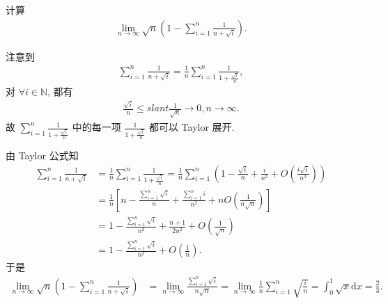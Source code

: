 \documentclass[../../main.tex]{subfiles}
\begin{document}
\begin{example}
计算
\begin{align*}
\lim_{n \to \infty} \sqrt{n} \left( 1 - \sum_{i=1}^n \frac{1}{n + \sqrt{i}} \right).
\end{align*}
\end{example}
\begin{note}
注意到
\begin{align*}
\sum_{i=1}^n \frac{1}{n + \sqrt{i}} = \frac{1}{n} \sum_{i=1}^n \frac{1}{1 + \frac{\sqrt{i}}{n}},
\end{align*}
对 $\forall i \in \mathbb{N}$, 都有
\begin{align*}
\frac{\sqrt{i}}{n} \leqslant slant \frac{1}{\sqrt{n}} \rightarrow 0, n \rightarrow \infty.
\end{align*}
故 $\sum_{i=1}^n \frac{1}{1 + \frac{\sqrt{i}}{n}}$ 中的每一项 $\frac{1}{1 + \frac{\sqrt{i}}{n}}$ 都可以 Taylor 展开.
\end{note}
\begin{solution}
由 Taylor 公式知
\begin{align*}
\sum_{i=1}^n \frac{1}{n + \sqrt{i}} &= \frac{1}{n} \sum_{i=1}^n \frac{1}{1 + \frac{\sqrt{i}}{n}} = \frac{1}{n} \sum_{i=1}^n \left( 1 - \frac{\sqrt{i}}{n} + \frac{i}{n^2} + O\left( \frac{i\sqrt{i}}{n^3} \right) \right) \\
&= \frac{1}{n} \left[ n - \frac{\sum\limits_{i=1}^n \sqrt{i}}{n} + \frac{\sum\limits_{i=1}^n i}{n^2} + nO\left( \frac{1}{n\sqrt{n}} \right) \right] \\
&= 1 - \frac{\sum\limits_{i=1}^n \sqrt{i}}{n^2} + \frac{n + 1}{2n^2} + O\left( \frac{1}{\sqrt{n}} \right) \\
&= 1 - \frac{\sum\limits_{i=1}^n \sqrt{i}}{n^2} + O\left( \frac{1}{n} \right).
\end{align*}
于是
\begin{align*}
\lim_{n \rightarrow \infty} \sqrt{n} \left( 1 - \sum_{i=1}^n \frac{1}{n + \sqrt{i}} \right) &= \lim_{n \rightarrow \infty} \frac{\sum\limits_{i=1}^n \sqrt{i}}{n\sqrt{n}} = \lim_{n \rightarrow \infty} \frac{1}{n} \sum\limits_{i=1}^n \sqrt{\frac{i}{n}} = \int_0^1 \sqrt{x} \mathrm{d}x = \frac{2}{3}.
\end{align*}
\end{solution}
\end{document}
